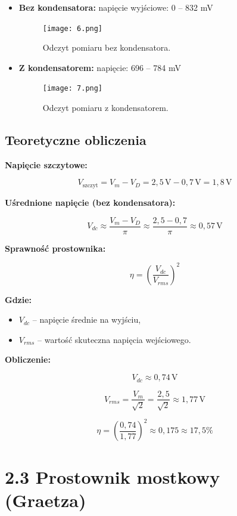 \documentclass[a4paper,12pt]{article}
\begin{document}
\begin{itemize}
    \item \textbf{Bez kondensatora:} napięcie wyjściowe: 0 -- 832 mV
    \begin{figure}[H]
        \centering
        \texttt{[image: 6.png]}
        \caption{Odczyt pomiaru bez kondensatora.}
        \label{fig:bez_kondensatora_dwu}
    \end{figure}

    \item \textbf{Z kondensatorem:} napięcie: 696 -- 784 mV
    \begin{figure}[H]
        \centering
        \texttt{[image: 7.png]}
        \caption{Odczyt pomiaru z kondensatorem.}
        \label{fig:z_kondensatorem_dwu}
    \end{figure}
\end{itemize}

\subsection*{Teoretyczne obliczenia}

\textbf{Napięcie szczytowe:}

\[
V_{\text{szczyt}} = V_m - V_D = 2{,}5\,\text{V} - 0{,}7\,\text{V} = 1{,}8\,\text{V}
\]

\textbf{Uśrednione napięcie (bez kondensatora):}

\[
V_{dc} \approx \frac{ V_m- V_D}{\pi}  \approx \frac{2{,}5-0{,}7}{\pi} \approx  0{,}57\,\text{V}
\]

\textbf{Sprawność prostownika:}

\[
\eta = \left( \frac{V_{dc}}{V_{rms}} \right)^2
\]

\textbf{Gdzie:}

\begin{itemize}
    \item $V_{dc}$ – napięcie średnie na wyjściu,
    \item $V_{rms}$ – wartość skuteczna napięcia wejściowego.
\end{itemize}

\textbf{Obliczenie:}

\[
V_{dc} \approx 0{,}74\,\text{V}
\]

\[
V_{rms} = \frac{V_m}{\sqrt{2}} = \frac{2{,}5}{\sqrt{2}} \approx 1{,}77\,\text{V}
\]

\[
\eta = \left( \frac{0{,}74}{1{,}77} \right)^2 \approx 0{,}175 \approx 17{,}5\%
\]
\section*{2.3 Prostownik mostkowy (Graetza)}
\end{document}
